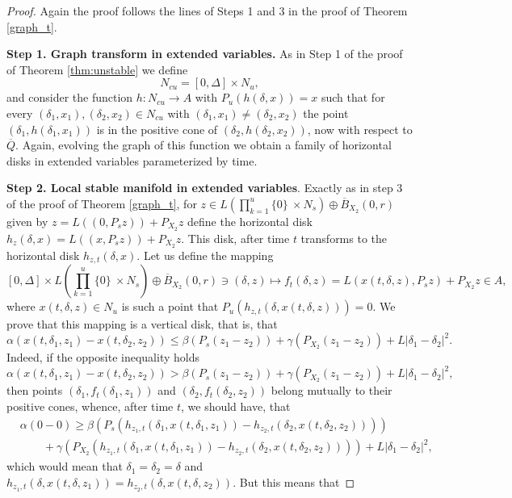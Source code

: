\documentclass[11pt, leqno]{amsart}
\theoremstyle{definition}
\begin{document}
\begin{proof}
	Again the proof follows the lines of Steps 1 and 3 in the proof of Theorem \ref{graph_t}.
	
	\textbf{Step 1. Graph transform in extended variables.}
	As in Step 1 of the proof of Theorem \ref{thm:unstable} we define
	$$
	N_{cu}=  [0,\Delta] \times N_u,
	$$
	and consider the function $h:N_{cu} \to A$ with $P_u(h(\delta,x)) = x$ such that for every $(\delta_1,x_1), (\delta_2,x_2)\in N_{cu}$ with $(\delta_1,x_1)\neq (\delta_2,x_2)$ the point $(\delta_1,h(\delta_1,x_1))$ is in the positive cone of $(\delta_2,h(\delta_2,x_2))$, now with respect to $\overline{Q}$. Again, evolving the graph of this function we obtain a family of horizontal disks in extended variables parameterized by time.
	
	
	\textbf{Step 2. Local stable manifold in extended variables}. Exactly as in step 3 of the proof of Theorem \ref{graph_t}, for $z\in L \left( \prod_{k=1}^{u} \{ 0 \}\ \times N_s\right) \oplus \overline{B}_{X_2}(0,r)$ given by $z = L((0,P_s z)) + P_{X_2} z$ define the horizontal disk $h_z(\delta,x) = L((x,P_s z)) + P_{X_2}z$. This disk, after time $t$ transforms to the horizontal disk $h_{z,t}(\delta,x)$. Let us define the mapping
	$$
	[0,\Delta]\times L \left( \prod_{k=1}^{u} \{ 0 \}\ \times N_s \right) \oplus \overline{B}_{X_2}(0,r) \ni (\delta,z) \mapsto f_t(\delta,z) = L(x(t,\delta,z),P_s z) + P_{X_2}z \in A,
	$$
	where $x(t,\delta,z) \in N_u$ is such a point that $P_u(h_{z,t}(\delta,x(t,\delta,z))) = 0.$ We prove that this mapping is a vertical disk, that is, that
	$$\alpha(x(t,\delta_1,z_1)-x(t,\delta_2,z_2)) \leq  \beta(P_s(z_1-z_2)) + \gamma(P_{X_2}(z_1-z_2)) + L |\delta_1-\delta_2|^2.
	$$
	Indeed, if the opposite inequality holds
	$$\alpha(x(t,\delta_1,z_1)-x(t,\delta_2,z_2)) >  \beta(P_s(z_1-z_2)) + \gamma(P_{X_2}(z_1-z_2)) + L |\delta_1-\delta_2|^2,
	$$
	then points $(\delta_1,f_t(\delta_1,z_1))$ and $(\delta_2,f_t(\delta_2,z_2))$ belong mutually to their positive cones, whence, after time $t$, we should have, that
	\begin{align*}
		& \alpha(0-0) \geq  \beta(P_{s}(h_{z_1,t}(\delta_1,x(t,\delta_1,z_1))-h_{z_2,t}(\delta_2,x(t,\delta_2,z_2)))) \\
		& \qquad + \gamma(P_{X_2}(h_{z_1,t}(\delta_1,x(t,\delta_1,z_1))-h_{z_2,t}(\delta_2,x(t,\delta_2,z_2)))) + L |\delta_1-\delta_2|^2,
	\end{align*}
	which would mean that $\delta_1=\delta_2=\delta$ and $h_{z_1,t}(\delta,x(t,\delta,z_1)) = h_{z_2,t}(\delta,x(t,\delta,z_2)).$ But this means that

\end{proof}
\end{document}
